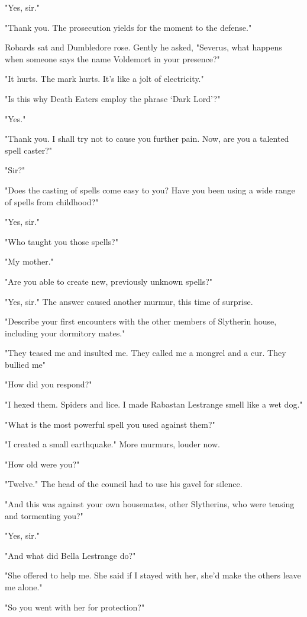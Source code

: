 "Yes, sir."

"Thank you. The prosecution yields for the moment to the defense."

Robards sat and Dumbledore rose. Gently he asked, "Severus, what happens when someone says the name Voldemort in your presence?"

"It hurts. The mark hurts. It's like a jolt of electricity."

"Is this why Death Eaters employ the phrase `Dark Lord'?"

"Yes."

"Thank you. I shall try not to cause you further pain. Now, are you a talented spell caster?"

"Sir?"

"Does the casting of spells come easy to you? Have you been using a wide range of spells from childhood?"

"Yes, sir."

"Who taught you those spells?"

"My mother."

"Are you able to create new, previously unknown spells?"

"Yes, sir." The answer caused another murmur, this time of surprise.

"Describe your first encounters with the other members of Slytherin house, including your dormitory mates."

"They teased me and insulted me. They called me a mongrel and a cur. They bullied me{\el}"

"How did you respond?"

"I hexed them. Spiders and lice. I made Rabastan Lestrange smell like a wet dog."

"What is the most powerful spell you used against them?"

"I created a small earthquake." More murmurs, louder now.

"How old were you?"

"Twelve." The head of the council had to use his gavel for silence.

"And this was against your own housemates, other Slytherins, who were teasing and tormenting you?"

"Yes, sir."

"And what did Bella Lestrange do?"

"She offered to help me. She said if I stayed with her, she'd make the others leave me alone."

"So you went with her for protection?"

